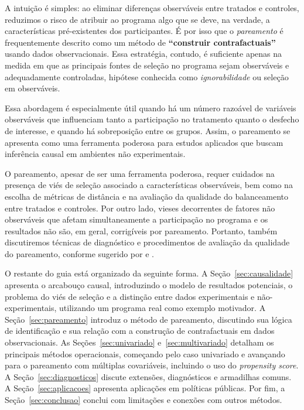 \documentclass[12pt,a4paper]{article}
\begin{document}
A intuição é simples: ao eliminar diferenças observáveis entre tratados e controles, reduzimos o risco de atribuir ao programa algo que se deve, na verdade, a características pré-existentes dos participantes. É por isso que o \textit{pareamento} é frequentemente descrito como um método de \textbf{``construir contrafactuais''} usando dados observacionais. Essa estratégia, contudo, é suficiente apenas na medida em que as principais fontes de seleção no programa sejam observáveis e adequadamente controladas, hipótese conhecida como \textit{ignorabilidade} ou seleção em observáveis.

Essa abordagem é especialmente útil quando há um número razoável de variáveis observáveis que influenciam tanto a participação no tratamento quanto o desfecho de interesse, e quando há sobreposição entre os grupos. Assim, o pareamento se apresenta como uma ferramenta poderosa para estudos aplicados que buscam inferência causal em ambientes não experimentais.

O pareamento, apesar de ser uma ferramenta poderosa, requer cuidados na presença de viés de seleção associado a características observáveis, bem como na escolha de métricas de distância e na avaliação da qualidade do balanceamento entre tratados e controles. Por outro lado, vieses decorrentes de fatores não observáveis que afetam simultaneamente a participação no programa e os resultados não são, em geral, corrigíveis por pareamento. Portanto, também discutiremos técnicas de diagnóstico e procedimentos de avaliação da qualidade do pareamento, conforme sugerido por \citet{abadie2006large} e \citet{imbens2004nonparametric}.

O restante do guia está organizado da seguinte forma. A Seção~\ref{sec:causalidade} apresenta o arcabouço causal, introduzindo o modelo de resultados potenciais, o problema do viés de seleção e a distinção entre dados experimentais e não-experimentais, utilizando um programa real como exemplo motivador. A Seção~\ref{sec:pareamento} introduz o método de pareamento, discutindo sua lógica de identificação e sua relação com a construção de contrafactuais em dados observacionais. As Seções~\ref{sec:univariado} e~\ref{sec:multivariado} detalham os principais métodos operacionais, começando pelo caso univariado e avançando para o pareamento com múltiplas covariáveis, incluindo o uso do \textit{propensity score}. A Seção~\ref{sec:diagnosticos} discute extensões, diagnósticos e armadilhas comuns. A Seção~\ref{sec:aplicacoes} apresenta aplicações em políticas públicas. Por fim, a Seção~\ref{sec:conclusao} conclui com limitações e conexões com outros métodos.
\end{document}
